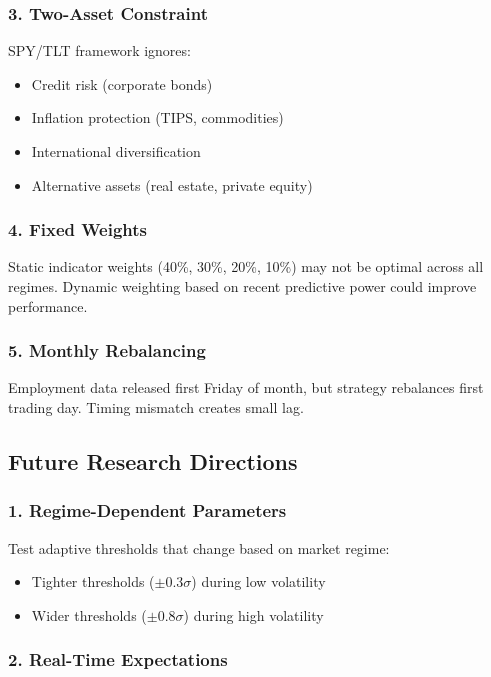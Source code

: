 \documentclass[12pt,a4paper]{article}
\begin{document}
\subsubsection{3. Two-Asset Constraint}

SPY/TLT framework ignores:
\begin{itemize}
    \item Credit risk (corporate bonds)
    \item Inflation protection (TIPS, commodities)
    \item International diversification
    \item Alternative assets (real estate, private equity)
\end{itemize}

\subsubsection{4. Fixed Weights}

Static indicator weights (40\%, 30\%, 20\%, 10\%) may not be optimal across all regimes. Dynamic weighting based on recent predictive power could improve performance.

\subsubsection{5. Monthly Rebalancing}

Employment data released first Friday of month, but strategy rebalances first trading day. Timing mismatch creates small lag.

\subsection{Future Research Directions}

\subsubsection{1. Regime-Dependent Parameters}

Test adaptive thresholds that change based on market regime:
\begin{itemize}
    \item Tighter thresholds ($\pm 0.3\sigma$) during low volatility
    \item Wider thresholds ($\pm 0.8\sigma$) during high volatility
\end{itemize}

\subsubsection{2. Real-Time Expectations}
\end{document}
